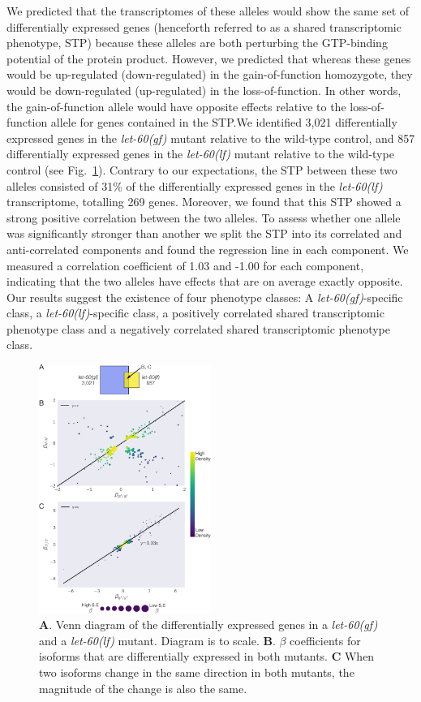 \documentclass[10pt, onecolumn]{article}
\newcommand{\gene}[1]{\mbox{\emph{#1}}}
\newcommand{\letgfn}{3,021}
\newcommand{\letlfn}{857}
\newcommand{\letgf}{\gene{let-60(gf)}}
\newcommand{\letlf}{\gene{let-60(lf)}}
\begin{document}
We predicted that the transcriptomes of these alleles would show the same set of
differentially expressed genes (henceforth referred to as a shared
transcriptomic phenotype, STP) because these alleles are both perturbing the
GTP-binding potential of the protein product. However, we predicted that whereas
these genes would be up-regulated (down-regulated) in the gain-of-function
homozygote, they would be down-regulated (up-regulated) in the loss-of-function.
In other words, the gain-of-function allele would have opposite effects relative
to the loss-of-function allele for genes contained in the STP.\@ We identified
\letgfn{} differentially expressed genes in the \letgf{} mutant relative to the
wild-type control, and \letlfn{} differentially expressed genes in the \letlf{}
mutant relative to the wild-type control (see Fig.~\ref{fig:rasplots}). Contrary
to our expectations, the STP between these two alleles consisted of 31\% of the
differentially expressed genes in the \letlf{} transcriptome, totalling 269
genes. Moreover, we found that this STP showed a strong positive correlation
between the two alleles. To assess whether one allele was significantly stronger
than another we split the STP into its correlated and anti-correlated components
and found the regression line in each component. We measured a correlation
coefficient of 1.03 and -1.00 for each component, indicating that the two
alleles have effects that are on average exactly opposite. Our results suggest
the existence of four phenotype classes: A \letgf{}-specific class, a
\letlf{}-specific class, a positively correlated shared transcriptomic phenotype
class and a negatively correlated shared transcriptomic phenotype class.

\begin{figure}
  \centering{}
  \includegraphics[width=0.5\textwidth]{../figs/ras_allele_plots.pdf}
  \caption{
    \textbf{A}. Venn diagram of the differentially expressed genes in a \letgf{}
    and a \letlf{} mutant. Diagram is to scale.
    \textbf{B}. $\beta$ coefficients for isoforms that are differentially
    expressed in both mutants.
    \textbf{C} When two isoforms change in the same direction in both mutants,
    the magnitude of the change is also the same.
  }
\label{fig:rasplots}
\end{figure}
\end{document}
